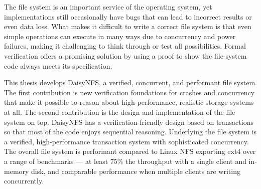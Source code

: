 The file system is an important service of the operating system, yet
implementations still occasionally have bugs that can lead to incorrect results
or even data loss. What makes it difficult to write a correct file system is
that even simple operations can execute in many ways due to concurrency and
power failures, making it challenging to think through or test all
possibilities. Formal verification offers a promising solution by using a proof
to show the file-system code always meets its specification.

This thesis develops DaisyNFS, a verified, concurrent, and performant file
system. The first contribution is new verification foundations for crashes and
concurrency that make it possible to reason about high-performance, realistic
storage systems at all. The second contribution is the design and implementation
of the file system on top. DaisyNFS has a verification-friendly design based on
transactions so that most of the code enjoys sequential reasoning. Underlying
the file system is a verified, high-performance transaction system with
sophisticated concurrency. The overall file system is performant compared to
Linux NFS exporting ext4 over a range of benchmarks --- at least 75\% the
throughput with a single client and in-memory disk, and comparable performance
when multiple clients are writing concurrently.
